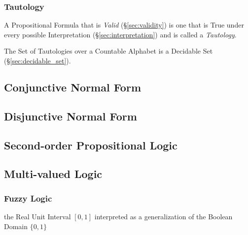 \subsubsection{Tautology}\label{sec:tautology}

A Propositional Formula that is \emph{Valid} (\S\ref{sec:validity}) is
one that is True under every possible Interpretation
(\S\ref{sec:interpretation}) and is called a \emph{Tautology}.

The Set of Tautologies over a Countable Alphabet is a Decidable Set
(\S\ref{sec:decidable_set}).



\subsection{Conjunctive Normal Form}\label{sec:conjunctive_form}

\subsection{Disjunctive Normal Form}\label{sec:disjunctive_form}

\subsection{Second-order Propositional Logic}
\label{sec:secondorder_propositional_logic}

\subsection{Multi-valued Logic}\label{sec:multi_valued_logic}

\subsubsection{Fuzzy Logic}\label{sec:fuzzy_logic}

the Real Unit Interval $[0,1]$ interpreted as a generalization of
the Boolean Domain $\{0, 1\}$



